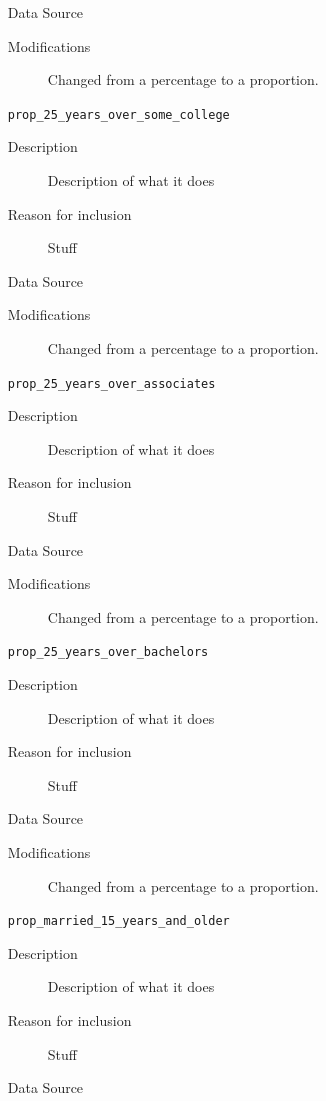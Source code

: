 \documentclass{article}
\begin{document}
\begin{itemize}[label={}, align=left]
\begin{description}
              \item[Data Source] \cite{acs_education_data}
              \item[Modifications] Changed from a percentage to a proportion.
          \end{description}
    \item[\texttt{prop\_25\_years\_over\_some\_college}] \
          \begin{description}
              \item[Description] Description of what it does
              \item[Reason for inclusion] Stuff
              \item[Data Source] \cite{acs_education_data}
              \item[Modifications] Changed from a percentage to a proportion.
          \end{description}
    \item[\texttt{prop\_25\_years\_over\_associates}] \
          \begin{description}
              \item[Description] Description of what it does
              \item[Reason for inclusion] Stuff
              \item[Data Source] \cite{acs_education_data}
              \item[Modifications] Changed from a percentage to a proportion.
          \end{description}
    \item[\texttt{prop\_25\_years\_over\_bachelors}] \
          \begin{description}
              \item[Description] Description of what it does
              \item[Reason for inclusion] Stuff
              \item[Data Source] \cite{acs_education_data}
              \item[Modifications] Changed from a percentage to a proportion.
          \end{description}
    \item[\texttt{prop\_married\_15\_years\_and\_older}] \
          \begin{description}
              \item[Description] Description of what it does
              \item[Reason for inclusion] Stuff
              \item[Data Source] \cite{acs_education_data}

\end{description}
\end{itemize}
\end{document}
